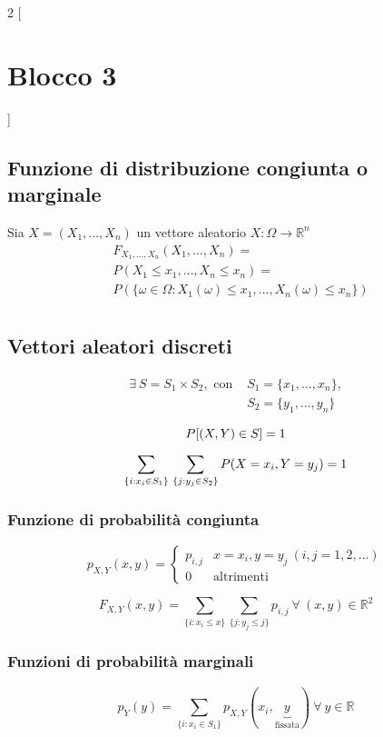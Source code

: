 \begin{multicols*}{2}
[\section*{Blocco 3}]
    
\subsection*{Funzione di distribuzione congiunta o marginale}
Sia $X = (X_1,\dots,X_n)$ un vettore aleatorio $X: \Omega \to \mathbb{R}^n$ 
\begin{align*}
&F_{X_1,\dots,X_n}(X_1,\dots,X_n) = \\
&P(X_1 \le x_1, \dots, X_n \le x_n) = \\
&P(\{\omega \in \Omega : X_1(\omega) \le x_1, \dots, X_n(\omega) \le x_n\})\\
\end{align*}

\subsection*{Vettori aleatori discreti}
\begin{align*}
\exists \ S = S_1 \times S_2, \text{ con } &S_1 = \{x_1,\dots,x_n\},
\\&S_2 = \{y_1,\dots,y_n\}
\end{align*}

$$
P[(X,Y) \in S] = 1\\
$$

$$
\sum_{\{i: x_i \in S_1\}}
\\\sum_{\{j: y_j \in S_2\}}
P(X = x_i, Y = y_j) = 1
$$

\subsubsection*{Funzione di probabilità congiunta}

$$p_{X,Y}(x, y) =
\begin{cases}
    p_{i,j} & x = x_i, y = y_j \ (i, j = 1,2,\dots)\\
    0 & \text{altrimenti}
\end{cases}$$

$$
F_{X,Y}(x,y) = \sum_{\{i : x_i \le x\}} \sum_{\{j : y_j \le j\}} p_{i,j} 
\ \forall \ (x, y) \in \mathbb{R}^2
$$

\subsubsection*{Funzioni di probabilità marginali}
$$
p_Y(y) = \sum_{\{i: x_i \in S_1\}}p_{X,Y}(x_i, \underbrace{y}_{\text{fissata}}) \ \forall \ y \in \mathbb{R}
$$


\end{multicols*}
